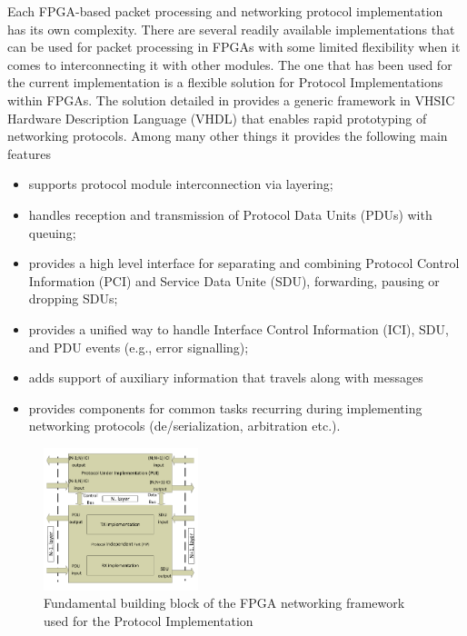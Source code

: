 \documentclass[journal]{IEEEtran}
\begin{document}
Each FPGA-based packet processing and networking protocol implementation has its own complexity. There are several
readily available implementations that can be used for packet processing in FPGAs with some limited flexibility when it
comes to interconnecting it
with other modules. The one that has been used for the current implementation is a flexible solution for Protocol
Implementations within FPGAs. The solution detailed in \cite{ProtoImpl} provides a generic framework in VHSIC Hardware
Description Language (VHDL) that enables rapid prototyping of networking protocols. Among many other things it provides
the following main features
\begin{itemize}
    \renewcommand \labelitemi{--}
    \item supports protocol module interconnection via layering;
    \item handles reception and transmission of Protocol Data Units (PDUs) with queuing;
    \item provides a high level interface for separating and combining  Protocol Control Information (PCI) and Service Data Unite (SDU),
          forwarding, pausing or dropping SDUs;
    \item provides a unified way to handle Interface Control Information (ICI), SDU, and PDU events (e.g., error signalling);
    \item adds support of auxiliary information that travels along with messages
    \item provides components for common tasks recurring during implementing networking protocols
          (de/serialization, arbitration etc.).
\end{itemize}

\begin{figure}[!htb]
    \centering
    \includegraphics[width=0.4\textwidth]{figures_raw/system_sketch.pdf}
    \caption{Fundamental building block of the FPGA networking framework used for the Protocol Implementation}
    \label{fig:system_sketch}
\end{figure}
\end{document}
